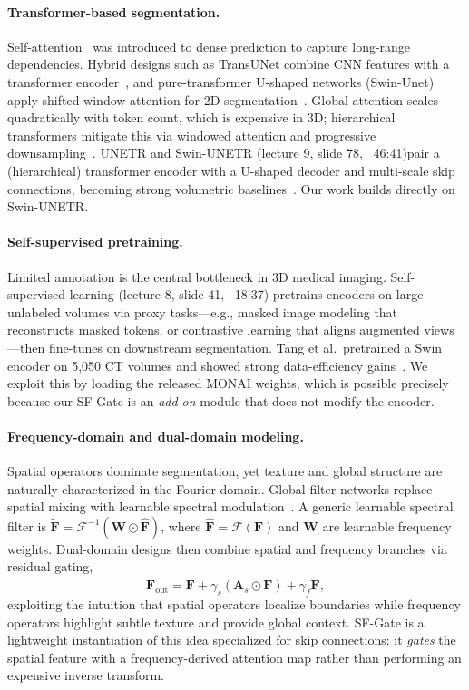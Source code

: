 \documentclass{article}
\begin{document}
\paragraph{Transformer-based segmentation.}
Self-attention~\citep{vaswani2017attention} was introduced to dense prediction to capture long-range dependencies. Hybrid designs such as TransUNet combine CNN features with a transformer encoder~\citep{chen2021transunet}, and pure-transformer U-shaped networks (Swin-Unet) apply shifted-window attention for 2D segmentation~\citep{cao2021swinunet}. Global attention scales quadratically with token count, which is expensive in 3D; hierarchical transformers mitigate this via windowed attention and progressive downsampling~\citep{liu2021swin}. UNETR and Swin-UNETR {(lecture 9, slide 78, ~46:41)}pair a (hierarchical) transformer encoder with a U-shaped decoder and multi-scale skip connections, becoming strong volumetric baselines~\citep{hatamizadeh2022unetr,hatamizadeh2022swinunetr}. Our work builds directly on Swin-UNETR.

\paragraph{Self-supervised pretraining.}
Limited annotation is the central bottleneck in 3D medical imaging. Self-supervised learning {(lecture 8, slide 41, ~18:37)} pretrains encoders on large unlabeled volumes via proxy tasks---e.g., masked image modeling that reconstructs masked tokens, or contrastive learning that aligns augmented views---then fine-tunes on downstream segmentation. Tang et al.\ pretrained a Swin encoder on 5,050 CT volumes and showed strong data-efficiency gains~\citep{tang2022swinunetrssl}. We exploit this by loading the released MONAI weights, which is possible precisely because our SF-Gate is an \emph{add-on} module that does not modify the encoder.

\paragraph{Frequency-domain and dual-domain modeling.}
Spatial operators dominate segmentation, yet texture and global structure are naturally characterized in the Fourier domain. Global filter networks replace spatial mixing with learnable spectral modulation~\citep{rao2021global}. A generic learnable spectral filter is $\widetilde{\mathbf{F}} = \mathcal{F}^{-1}(\mathbf{W}\odot\hat{\mathbf{F}})$, where $\hat{\mathbf{F}}=\mathcal{F}(\mathbf{F})$ and $\mathbf{W}$ are learnable frequency weights. Dual-domain designs then combine spatial and frequency branches via residual gating,
\begin{equation}
  \mathbf{F}_{\mathrm{out}} = \mathbf{F} + \gamma_{s}(\mathbf{A}_{s}\odot\mathbf{F}) + \gamma_{f}\widetilde{\mathbf{F}},
\end{equation}
exploiting the intuition that spatial operators localize boundaries while frequency operators highlight subtle texture and provide global context. SF-Gate is a lightweight instantiation of this idea specialized for skip connections: it \emph{gates} the spatial feature with a frequency-derived attention map rather than performing an expensive inverse transform.
\end{document}
